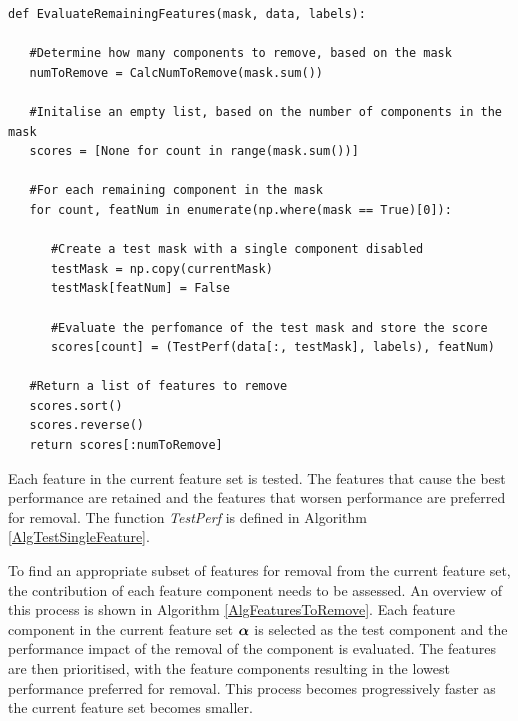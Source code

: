 \begin{algorithm}
\scriptsize 
\lstset{language=Python}
\begin{lstlisting}[frame=single]
def EvaluateRemainingFeatures(mask, data, labels):

   #Determine how many components to remove, based on the mask
   numToRemove = CalcNumToRemove(mask.sum()) 

   #Initalise an empty list, based on the number of components in the mask
   scores = [None for count in range(mask.sum())] 

   #For each remaining component in the mask
   for count, featNum in enumerate(np.where(mask == True)[0]):

      #Create a test mask with a single component disabled
      testMask = np.copy(currentMask)
      testMask[featNum] = False

      #Evaluate the perfomance of the test mask and store the score
      scores[count] = (TestPerf(data[:, testMask], labels), featNum)

   #Return a list of features to remove
   scores.sort()
   scores.reverse()
   return scores[:numToRemove]
\end{lstlisting}
\normalsize
\caption{Each feature in the current feature set is tested. The features that cause the best performance are retained and the features that worsen performance are preferred for removal. The function \textit{TestPerf} is defined in Algorithm \ref{AlgTestSingleFeature}.}
\label{AlgFeaturesToRemove}
\end{algorithm}

To find an appropriate subset of features for removal from the current feature set, the contribution of each feature component needs to be assessed. An overview of this process is shown in Algorithm \ref{AlgFeaturesToRemove}. %
Each feature component in the current feature set $\boldsymbol\alpha$ is selected as the test component and the performance impact of the removal of the component is evaluated. The features are then prioritised, with the feature components resulting in the lowest performance preferred for removal. This process becomes progressively faster as the current feature set becomes smaller.


